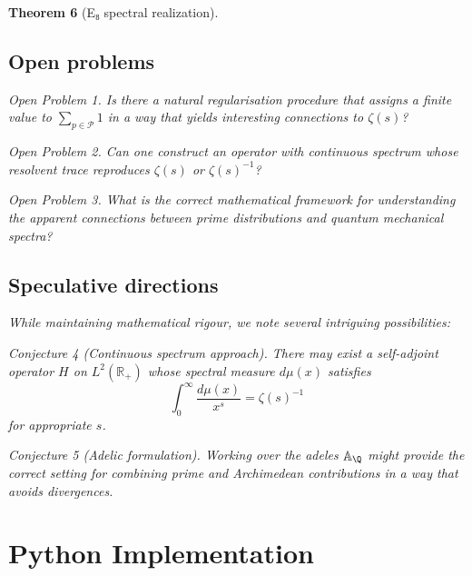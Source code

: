 \documentclass[11pt,a4paper]{article}
\newtheorem{theorem}{Theorem}[section]
\theoremstyle{definition}
\theoremstyle{remark}
\newtheorem{conjecture}[theorem]{Conjecture}
\newtheorem{openproblem}[theorem]{Open Problem}
\newcommand{\R}{\mathbb{R}}
\newcommand{\calP}{\mathcal{P}}
\begin{document}
\begin{theorem}[E₈ spectral realization]
\subsection{Open problems}

\begin{openproblem}
Is there a natural regularisation procedure that assigns a finite value to 
$\sum_{p \in \calP} 1$ in a way that yields interesting connections to $\zeta(s)$?
\end{openproblem}

\begin{openproblem}
Can one construct an operator with continuous spectrum whose resolvent trace 
reproduces $\zeta(s)$ or $\zeta(s)^{-1}$?
\end{openproblem}

\begin{openproblem}
What is the correct mathematical framework for understanding the apparent 
connections between prime distributions and quantum mechanical spectra?
\end{openproblem}

\subsection{Speculative directions}

While maintaining mathematical rigour, we note several intriguing possibilities:

\begin{conjecture}[Continuous spectrum approach]
There may exist a self-adjoint operator $H$ on $L^2(\R_+)$ whose spectral measure 
$d\mu(x)$ satisfies
\[
\int_0^\infty \frac{d\mu(x)}{x^s} = \zeta(s)^{-1}
\]
for appropriate $s$.
\end{conjecture}

\begin{conjecture}[Adelic formulation]
Working over the adeles $\mathbb{A}_\Q$ might provide the correct setting for 
combining prime and Archimedean contributions in a way that avoids divergences.
\end{conjecture}

\appendix

\section{Python Implementation}\label{app:code}


\end{theorem}
\end{document}
